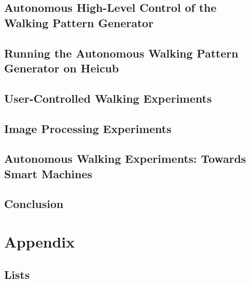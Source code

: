 \documentclass  [
paper    = a4,
BCOR     = 10mm,
twoside,
fontsize = 12pt,
toc      = bibnumbered,
toc      = listofnumbered,
numbers  = noendperiod,
headings = normal,
listof   = leveldown,
version  = 3.03
]                                       {scrreprt}
\begin{document}
	\chapter{Autonomous High-Level Control of the Walking Pattern Generator}
	
	
	\chapter{Running the Autonomous Walking Pattern Generator on Heicub}
	
	
	\chapter{User-Controlled Walking Experiments}
	
	

	\chapter{Image Processing Experiments}
	

	\chapter{Autonomous Walking Experiments: Towards Smart Machines}
	
	
	\chapter{Conclusion}
	
	
	\part{Appendix}
	\begin{appendix}
		\label{sec::a}
		
		
		\chapter{Lists}
		\listoffigures
		\listoftables
		
		
		
		
	\end{appendix}
\end{document}
